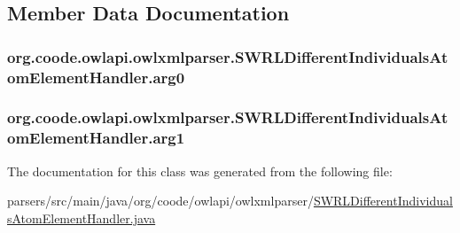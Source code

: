 \subsection{Member Data Documentation}
\hypertarget{classorg_1_1coode_1_1owlapi_1_1owlxmlparser_1_1_s_w_r_l_different_individuals_atom_element_handler_ac372d4f7d3a5203e15899b3330dbc6c3}{
\subsubsection[{arg0}]{ org.\-coode.\-owlapi.\-owlxmlparser.\-S\-W\-R\-L\-Different\-Individuals\-Atom\-Element\-Handler.\-arg0\hspace{0.3cm}{\ttfamily [private]}}}\label{classorg_1_1coode_1_1owlapi_1_1owlxmlparser_1_1_s_w_r_l_different_individuals_atom_element_handler_ac372d4f7d3a5203e15899b3330dbc6c3}
\hypertarget{classorg_1_1coode_1_1owlapi_1_1owlxmlparser_1_1_s_w_r_l_different_individuals_atom_element_handler_ad31f612c6877a74773b71d291041d16a}{
\subsubsection[{arg1}]{ org.\-coode.\-owlapi.\-owlxmlparser.\-S\-W\-R\-L\-Different\-Individuals\-Atom\-Element\-Handler.\-arg1\hspace{0.3cm}{\ttfamily [private]}}}\label{classorg_1_1coode_1_1owlapi_1_1owlxmlparser_1_1_s_w_r_l_different_individuals_atom_element_handler_ad31f612c6877a74773b71d291041d16a}


The documentation for this class was generated from the following file\-:\begin{DoxyCompactItemize}
\item 
parsers/src/main/java/org/coode/owlapi/owlxmlparser/\hyperlink{_s_w_r_l_different_individuals_atom_element_handler_8java}{S\-W\-R\-L\-Different\-Individuals\-Atom\-Element\-Handler.\-java}\end{DoxyCompactItemize}

